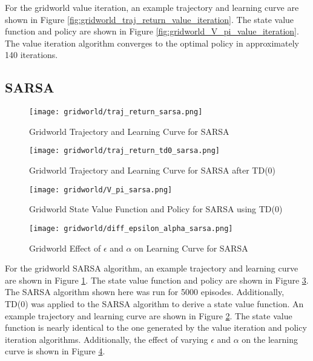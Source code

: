 For the gridworld value iteration, an example trajectory and learning curve are shown in Figure \ref{fig:gridworld_traj_return_value_iteration}. The state value function and policy are shown in Figure \ref{fig:gridworld_V_pi_value_iteration}. The value iteration algorithm converges to the optimal policy in approximately 140 iterations.

\subsection*{SARSA}
\begin{figure}[ht]
\centering
\texttt{[image: gridworld/traj\_return\_sarsa.png]}
\caption{Gridworld Trajectory and Learning Curve for SARSA}
\label{fig:gridworld_traj_return_sarsa}
\end{figure}

\begin{figure}[ht]
\centering
\texttt{[image: gridworld/traj\_return\_td0\_sarsa.png]}
\caption{Gridworld Trajectory and Learning Curve for SARSA after TD(0)}
\label{fig:gridworld_traj_return_td0_sarsa}
\end{figure}

\begin{figure}[ht]
\centering
\texttt{[image: gridworld/V\_pi\_sarsa.png]}
\caption{Gridworld State Value Function and Policy for SARSA using TD(0)}
\label{fig:gridworld_V_pi_sarsa}
\end{figure}

\begin{figure}
\centering
\texttt{[image: gridworld/diff\_epsilon\_alpha\_sarsa.png]}
\caption{Gridworld Effect of $\epsilon$ and $\alpha$ on Learning Curve for SARSA}
\label{fig:gridworld_diff_epsilon_alpha_sarsa}
\end{figure}

For the gridworld SARSA algorithm, an example trajectory and learning curve are shown in Figure \ref{fig:gridworld_traj_return_sarsa}. The state value function and policy are shown in Figure \ref{fig:gridworld_V_pi_sarsa}. The SARSA algorithm shown here was run for 5000 episodes. Additionally, TD(0) was applied to the SARSA algorithm to derive a state value function. An example trajectory and learning curve are shown in Figure \ref{fig:gridworld_traj_return_td0_sarsa}. The state value function is nearly identical to the one generated by the value iteration and policy iteration algorithms. Additionally, the effect of varying $\epsilon$ and $\alpha$ on the learning curve is shown in Figure \ref{fig:gridworld_diff_epsilon_alpha_sarsa}.

